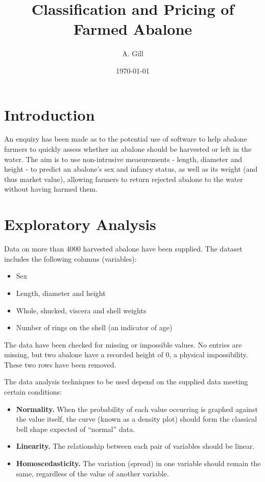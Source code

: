 \documentclass[11pt, a4paper]{article}
\title{\large\bfseries Classification and Pricing of Farmed Abalone}
\author{\normalsize A. Gill}
\date{\small \today}
\begin{document}
    
    \maketitle

    \section*{Introduction}    
      
    An enquiry has been made as to the potential use of software to help abalone farmers to quickly assess whether an abalone should be harvested or left in the water. The aim is to use non-intrusive measurements - length, diameter and height - to predict an abalone's sex and infancy status, as well as its weight (and thus market value), allowing farmers to return rejected abalone to the water without having harmed them.

    \section{Exploratory Analysis}

    Data on more than 4000 harvested abalone have been supplied. The dataset includes the following columns (variables):

    \begin{itemize}
        \item Sex
        \item Length, diameter and height
        \item Whole, shucked, viscera and shell weights
        \item Number of rings on the shell (an indicator of age)
    \end{itemize}

    The data have been checked for missing or impossible values. No entries are missing, but two abalone have a recorded height of 0, a physical impossibility. These two rows have been removed.

    The data analysis techniques to be used depend on the supplied data meeting certain conditions:

    \begin{itemize}
        \item \textbf{Normality.} When the probability of each value occurring is graphed against the value itself, the curve (known as a density plot) should form the classical bell shape expected of ``normal'' data.
        \item \textbf{Linearity.} The relationship between each pair of variables should be linear.
        \item \textbf{Homoscedasticity.} The variation (spread) in one variable should remain the same, regardless of the value of another variable. 
    \end{itemize}
\end{document}
